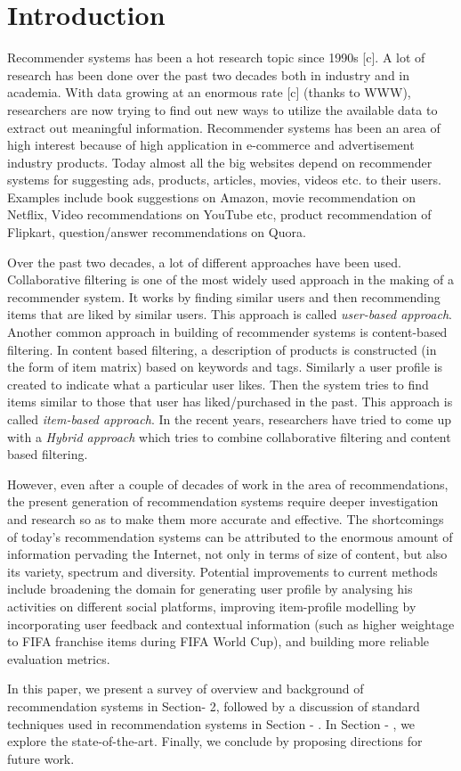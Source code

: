 \section{Introduction}
Recommender systems has been a hot research topic since 1990s [c]. A lot of research has been done over the past two decades both in industry and in academia. With data growing at an enormous rate [c] (thanks to WWW), researchers are now trying to find out new ways to utilize the available data to extract out meaningful information.  Recommender systems has been an area of high interest because of high application in e-commerce and advertisement industry products. Today almost all the big websites depend on recommender systems for suggesting ads, products, articles, movies, videos etc. to their users. Examples include book suggestions on Amazon, movie recommendation on Netflix, Video recommendations on YouTube etc, product recommendation of Flipkart, question/answer recommendations on Quora. 

Over the past two decades, a lot of different approaches have been used. Collaborative filtering is one of the most widely used approach in the making of a recommender system. It works by finding similar users and then recommending items that are liked by similar users. This approach is called \textit{user-based approach}. Another common approach in building of recommender systems is content-based filtering. In content based filtering, a description of products is constructed (in the form of item matrix) based on keywords and tags. Similarly a user profile is created to indicate what a particular user likes. Then the system tries to find items similar to those that user has liked/purchased in the past. This approach is called \textit{item-based approach}. In the recent years, researchers have tried to come up with a \textit{Hybrid approach} which tries to combine collaborative filtering and content based filtering. 

However, even after a couple of decades of work in the area of recommendations, the present generation of recommendation systems require deeper investigation and research so as to make them more accurate and effective. The shortcomings of today's recommendation systems can be attributed to the enormous amount of information pervading the Internet, not only in terms of size of content, but also its variety, spectrum and diversity. Potential improvements to current methods include broadening the domain for generating user profile by analysing his activities on different social platforms, improving item-profile modelling by incorporating user feedback and contextual information (such as higher weightage to FIFA franchise items during FIFA World Cup), and building more reliable evaluation metrics. 

In this paper, we present a survey of overview and background of recommendation systems in Section- 2, followed by a discussion of standard techniques used in recommendation systems in Section - . In Section - , we explore the state-of-the-art. Finally, we conclude by proposing directions for future work. 